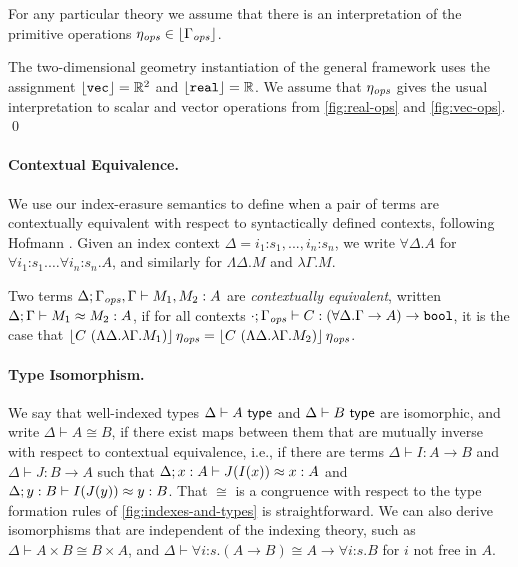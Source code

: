 For any particular theory we assume that there is an
interpretation of the primitive operations $\eta_{\mathit{ops}} \in \left\lfloor \Gamma_{\mathit{ops}} \right\rfloor$.

\begin{example*}
  The two-dimensional geometry instantiation of the general framework
  uses the assignment $\left\lfloor \textup{\texttt{vec}} \right\rfloor = \mathbb{R}^2$ and
  $\left\lfloor \textup{\texttt{real}} \right\rfloor = \mathbb{R}$.
  We assume that $\eta_{\mathit{ops}}$ gives the usual interpretation to scalar
  and vector operations from
  \autoref{fig:real-ops} and \autoref{fig:vec-ops}.
\qed
\end{example*}



\paragraph{Contextual Equivalence.}
We use our index-erasure semantics to define when a pair of terms are
contextually equivalent with respect to syntactically defined
contexts, following Hofmann \cite{hofmann08correctness}.  Given an
index context $\Delta = i_1\mathord:s_1,...,i_n\mathord:s_n$, we write
$\forall \Delta.A$ for $\forall i_1\mathord:s_1.\dots\forall
i_n\mathord:s_n.A$, and similarly for $\Lambda\Delta.M$ and $\lambda
\Gamma.M$.
\begin{definition}\label{defn:ctxt-equiv}
Two terms $\Delta; \Gamma_{\mathit{ops}}, \Gamma \vdash M_1, M_2 : A$
are \emph{contextually equivalent}, written ${\Delta};{\Gamma}\vdash{M_1}\approx{M_2}:{A}$, if 
  for all
  contexts $\cdot;\Gamma_{\mathit{ops}} \vdash C : (\forall \Delta. \Gamma
  \to A) \to \textup{\texttt{bool}}$, it is the case that $\left\lfloor{C\ (\Lambda
    \Delta. \lambda \Gamma. M_1)}\right\rfloor\eta_{\mathit{ops}} = \left\lfloor{C\
    (\Lambda \Delta. \lambda \Gamma. M_2)}\right\rfloor\eta_{\mathit{ops}}$.
\end{definition}


\paragraph{Type Isomorphism.}
We say that well-indexed types $\Delta \vdash A \textup{\textsf{ type}}$ and $\Delta\vdash B \textup{\textsf{ type}}$
are isomorphic, and write $\Delta\vdash A \cong
B$, if there exist maps between them that are mutually inverse with
respect to contextual equivalence, i.e., if there are terms $\Delta\vdash I
: A \to B$ and $\Delta\vdash J : B\to A$ such that ${\Delta};{x:A}\vdash{J(I(x))}\approx{x}:{A}$ 
and ${\Delta};{y:B}\vdash{I(J(y))}\approx{y}:{B}$.
That $\cong$ is a congruence with respect to the type formation rules
of \autoref{fig:indexes-and-types} is straightforward. We can also
derive isomorphisms that are independent of the indexing theory, such
as $\Delta\vdash A\times B \cong B \times A$, and $\Delta\vdash\forall
i\mathord:s.(A\to B)\cong A\to\forall i\mathord:s.B$ for $i$ not free in $A$.

